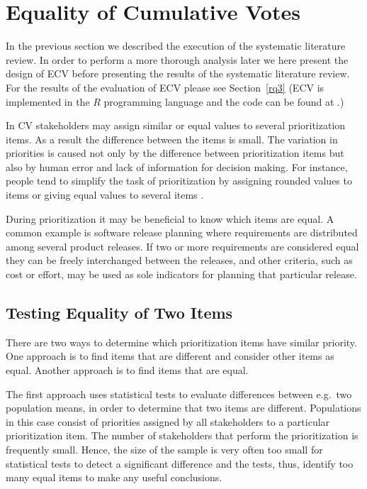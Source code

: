 \section{Equality of Cumulative Votes \label{ecv}}
In the previous section we described the execution of the systematic literature review. In order to perform a more thorough analysis later we here present the design of ECV before presenting the results of the systematic literature review. For the results of the evaluation of ECV please see Section~\ref{rq3} (ECV is implemented in the $R$ programming language \cite{Ihaka1996} and the code can be found at \cite{Rinkevics2011}.)

In CV stakeholders may assign similar or equal values to several prioritization items. As a result the difference between the items is small. The variation in priorities is caused not only by the difference between prioritization items but also by human error and lack of information for decision making. For instance, people tend to simplify the task of prioritization by assigning rounded values to items or giving equal values to several items \cite{Groves2009}.

During prioritization it may be beneficial to know which items are equal. A common example is software release planning where requirements are distributed among several product releases. If two or more requirements are considered equal they can be freely interchanged between the releases, and other criteria, such as cost or effort, may be used as sole indicators for planning that particular release.

\subsection{\label{Testing-Equality-of}Testing Equality of Two Items}
There are two ways to determine which prioritization items have similar priority.
One approach is to find items that are different and consider other items as equal.
Another approach is to find items that are equal.

The first approach uses statistical tests to evaluate differences between e.g.\ two population means, in order to determine that two items are different.
Populations in this case consist of priorities assigned by all stakeholders to a particular prioritization item.
The number of stakeholders that perform the prioritization is frequently small.
Hence, the size of the sample is very often too small for statistical tests to detect a significant difference and the tests, thus, identify too many equal items to make any useful conclusions.

